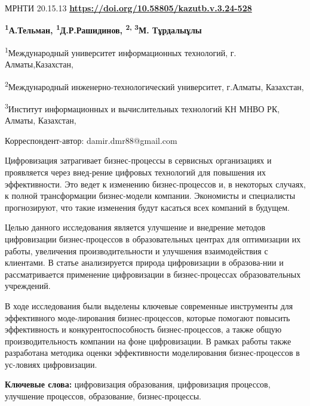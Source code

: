\newpage
 МРНТИ 20.15.13
\hfill {\bfseries \href{https://doi.org/10.58805/kazutb.v.3.24-528}{https://doi.org/10.58805/kazutb.v.3.24-528}}


\begin{center}


{\bfseries \textsuperscript{1}А.Тельман, \textsuperscript{1}Д.Р.Рашидинов\envelope, \textsuperscript{2, 3}М. Тұрдалыұлы}

\textsuperscript{1}Международный университет информационных технологий, г. Алматы,Казахстан,

\textsuperscript{2}Международный инженерно-технологический университет, г.Алматы, Казахстан,

\textsuperscript{3}Институт информационных и вычислительных технологий КН МНВО РК, Алматы, Казахстан,
\end{center}
\envelope Корреспондент-автор: damir.dmr88@gmail.com\vspace{0.5cm}

Цифровизация затрагивает бизнес-процессы в сервисных организациях и
проявляется через внед-рение цифровых технологий для повышения их
эффективности. Это ведет к изменению бизнес-процессов и, в некоторых
случаях, к полной трансформации бизнес-модели компании. Экономисты и
специалисты прогнозируют, что такие изменения будут касаться всех
компаний в будущем.

Целью данного исследования является улучшение и внедрение методов
цифровизации бизнес-процессов в образовательных центрах для оптимизации
их работы, увеличения производительности и улучшения взаимодействия с
клиентами. В статье анализируется природа цифровизации в образова-нии и
рассматривается применение цифровизации в бизнес-процессах
образовательных учреждений.

В ходе исследования были выделены ключевые современные инструменты для
эффективного моде-лирования бизнес-процессов, которые помогают повысить
эффективность и конкурентоспособность бизнес-процессов, а также общую
производительность компании на фоне цифровизации. В рамках работы также
разработана методика оценки эффективности моделирования бизнес-процессов
в ус-ловиях цифровизации.

{\bfseries Ключевые слова:} цифровизация образования, цифровизация
процессов, улучшение процессов, образование, бизнес-процессы.


